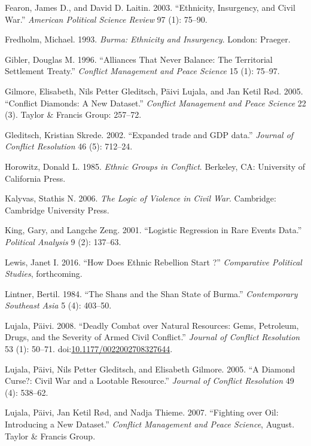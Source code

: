 \documentclass[12pt,]{book}
\theoremstyle{definition}
\theoremstyle{definition}
\theoremstyle{remark}
\begin{document}
\hypertarget{ref-fearonlaitin03}{}
Fearon, James D., and David D. Laitin. 2003. ``Ethnicity, Insurgency,
and Civil War.'' \emph{American Political Science Review} 97 (1):
75--90.

\hypertarget{ref-Fredholm1993}{}
Fredholm, Michael. 1993. \emph{Burma: Ethnicity and Insurgency}. London:
Praeger.

\hypertarget{ref-Gibler1996}{}
Gibler, Douglas M. 1996. ``Alliances That Never Balance: The Territorial
Settlement Treaty.'' \emph{Conflict Management and Peace Science} 15
(1): 75--97.

\hypertarget{ref-Gilmore2007}{}
Gilmore, Elisabeth, Nils Petter Gleditsch, Päivi Lujala, and Jan Ketil
Rød. 2005. ``Conflict Diamonds: A New Dataset.'' \emph{Conflict
Management and Peace Science} 22 (3). Taylor \& Francis Group: 257--72.

\hypertarget{ref-Gleditsch2002b}{}
Gleditsch, Kristian Skrede. 2002. ``Expanded trade and GDP data.''
\emph{Journal of Conflict Resolution} 46 (5): 712--24.

\hypertarget{ref-horowitz85}{}
Horowitz, Donald L. 1985. \emph{Ethnic Groups in Conflict}. Berkeley,
CA: University of California Press.

\hypertarget{ref-Kalyvas2006}{}
Kalyvas, Stathis N. 2006. \emph{The Logic of Violence in Civil War}.
Cambridge: Cambridge University Press.

\hypertarget{ref-King2001a}{}
King, Gary, and Langche Zeng. 2001. ``Logistic Regression in Rare Events
Data.'' \emph{Political Analysis} 9 (2): 137--63.

\hypertarget{ref-Lewis2016}{}
Lewis, Janet I. 2016. ``How Does Ethnic Rebellion Start ?''
\emph{Comparative Political Studies}, forthcoming.

\hypertarget{ref-Lintner1984}{}
Lintner, Bertil. 1984. ``The Shans and the Shan State of Burma.''
\emph{Contemporary Southeast Asia} 5 (4): 403--50.

\hypertarget{ref-Lujala2008}{}
Lujala, Päivi. 2008. ``Deadly Combat over Natural Resources: Gems,
Petroleum, Drugs, and the Severity of Armed Civil Conflict.''
\emph{Journal of Conflict Resolution} 53 (1): 50--71.
doi:\href{https://doi.org/10.1177/0022002708327644}{10.1177/0022002708327644}.

\hypertarget{ref-Lujala2005}{}
Lujala, Päivi, Nils Petter Gleditsch, and Elisabeth Gilmore. 2005. ``A
Diamond Curse?: Civil War and a Lootable Resource.'' \emph{Journal of
Conflict Resolution} 49 (4): 538--62.

\hypertarget{ref-Lujala2007}{}
Lujala, Päivi, Jan Ketil Rød, and Nadja Thieme. 2007. ``Fighting over
Oil: Introducing a New Dataset.'' \emph{Conflict Management and Peace
Science}, August. Taylor \& Francis Group.
\end{document}
